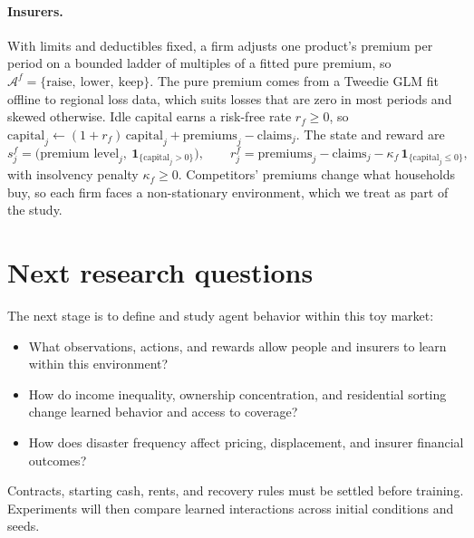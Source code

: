 \documentclass[11pt]{article}
\begin{document}
\paragraph{Insurers.} With limits and deductibles fixed, a firm adjusts one product's premium per period on a bounded ladder of multiples of a fitted pure premium, so $\mathcal{A}^{f}=\{\text{raise},\ \text{lower},\ \text{keep}\}$. The pure premium comes from a Tweedie GLM fit offline to regional loss data, which suits losses that are zero in most periods and skewed otherwise. Idle capital earns a risk-free rate $r_f\ge0$, so $\text{capital}_j\gets(1+r_f)\,\text{capital}_j+\text{premiums}_j-\text{claims}_j$. The state and reward are
\begin{equation}
 s^{f}_j=\big(\text{premium level}_j,\ \mathbf{1}_{\{\text{capital}_j>0\}}\big),
 \qquad
 r^{f}_j=\text{premiums}_j-\text{claims}_j-\kappa_f\,\mathbf{1}_{\{\text{capital}_j\le0\}},
\end{equation}
with insolvency penalty $\kappa_f\ge0$. Competitors' premiums change what households buy, so each firm faces a non-stationary environment, which we treat as part of the study.

\section{Next research questions}
The next stage is to define and study agent behavior within this toy market:

\begin{itemize}
\item What observations, actions, and rewards allow people and insurers to learn within this environment?
\item How do income inequality, ownership concentration, and residential sorting change learned behavior and access to coverage?
\item How does disaster frequency affect pricing, displacement, and insurer financial outcomes?
\end{itemize}
Contracts, starting cash, rents, and recovery rules must be settled before training. Experiments will then compare learned interactions across initial conditions and seeds.
\end{document}
